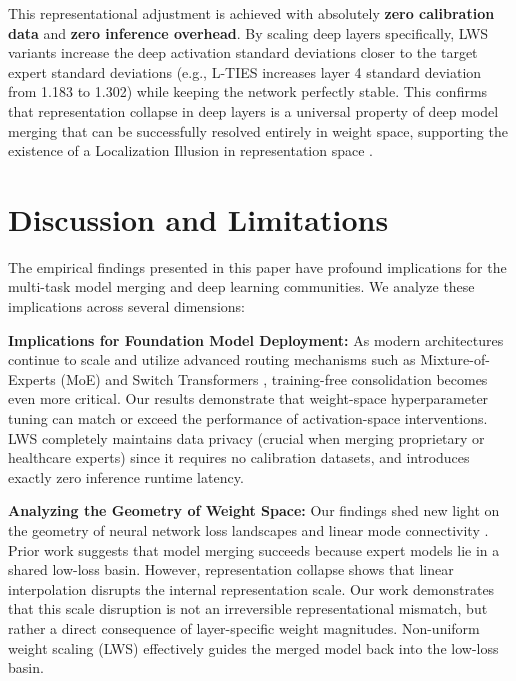 \documentclass{article}
\theoremstyle{plain}
\theoremstyle{definition}
\theoremstyle{remark}
\begin{document}
This representational adjustment is achieved with absolutely \textbf{zero calibration data} and \textbf{zero inference overhead}. By scaling deep layers specifically, LWS variants increase the deep activation standard deviations closer to the target expert standard deviations (e.g., L-TIES increases layer 4 standard deviation from 1.183 to 1.302) while keeping the network perfectly stable. This confirms that representation collapse in deep layers is a universal property of deep model merging that can be successfully resolved entirely in weight space, supporting the existence of a Localization Illusion in representation space \cite{deconstructing_cal}.

\section{Discussion and Limitations}
\label{sec:discussion}

The empirical findings presented in this paper have profound implications for the multi-task model merging and deep learning communities. We analyze these implications across several dimensions:

\textbf{Implications for Foundation Model Deployment:}
As modern architectures continue to scale and utilize advanced routing mechanisms such as Mixture-of-Experts (MoE) and Switch Transformers \cite{switch_transformer, routing}, training-free consolidation becomes even more critical. Our results demonstrate that weight-space hyperparameter tuning can match or exceed the performance of activation-space interventions. LWS completely maintains data privacy (crucial when merging proprietary or healthcare experts) since it requires no calibration datasets, and introduces exactly zero inference runtime latency.

\textbf{Analyzing the Geometry of Weight Space:}
Our findings shed new light on the geometry of neural network loss landscapes and linear mode connectivity \cite{lmc1, lmc2, loss_landscapes, weight_space_geometry, deep_learning_theory}. Prior work suggests that model merging succeeds because expert models lie in a shared low-loss basin. However, representation collapse shows that linear interpolation disrupts the internal representation scale. Our work demonstrates that this scale disruption is not an irreversible representational mismatch, but rather a direct consequence of layer-specific weight magnitudes. Non-uniform weight scaling (LWS) effectively guides the merged model back into the low-loss basin.
\end{document}
